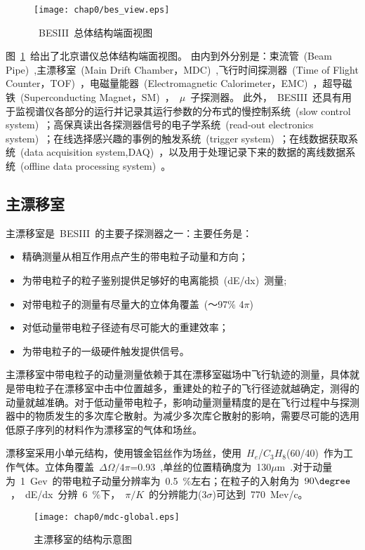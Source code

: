 \begin{figure}[!h]
  \centering
  \texttt{[image: chap0/bes\_view.eps]}
  \caption{~BESIII~总体结构端面视图}
  \label{fig:BESIII}
\end{figure}
图~\ref{fig:BESIII}~给出了北京谱仪总体结构端面视图。
由内到外分别是：束流管~(Beam Pipe)~,主漂移室~(Main Drift Chamber，MDC)~,飞行时间探测器~(Time of Flight Counter，TOF)~，电磁量能器~(Electromagnetic Calorimeter，EMC)~，超导磁铁~(Superconducting Magnet，SM)~，~$\mu$~子探测器。
此外，~BESIII~还具有用于监视谱仪各部分的运行并记录其运行参数的分布式的慢控制系统~(slow control system)~；高保真读出各探测器信号的电子学系统~(read-out electronics system)~；在线选择感兴趣的事例的触发系统~(trigger system)~；在线数据获取系统~(data acquisition system,DAQ)~，以及用于处理记录下来的数据的离线数据系统~(offline data processing system)~。
\subsection{主漂移室}
主漂移室是~BESIII~的主要子探测器之一：主要任务是：

\begin{itemize}
\item{精确测量从相互作用点产生的带电粒子动量和方向；}
\item{为带电粒子的粒子鉴别提供足够好的电离能损~(dE/dx)~测量;}
\item{对带电粒子的测量有尽量大的立体角覆盖~(～97$\%$ 4$\pi$)~}
\item{对低动量带电粒子径迹有尽可能大的重建效率；}
\item{为带电粒子的一级硬件触发提供信号。}
\end{itemize}


主漂移室中带电粒子的动量测量依赖于其在漂移室磁场中飞行轨迹的测量，具体就是带电粒子在漂移室中击中位置越多，重建处的粒子的飞行径迹就越确定，测得的动量就越准确。对于低动量带电粒子，影响动量测量精度的是在飞行过程中与探测器中的物质发生的多次库仑散射。为减少多次库仑散射的影响，需要尽可能的选用低原子序列的材料作为漂移室的气体和场丝。

漂移室采用小单元结构，使用镀金铝丝作为场丝，使用~$H_{e}$/$C_{3}H_{8}$(60/40)~作为工作气体。立体角覆盖~$\Delta\Omega/4\pi$=0.93~,单丝的位置精确度为~130$\mu$m~.对于动量为~1~Gev~的带电粒子动量分辨率为~0.5~$\%$左右；在粒子的入射角为~$90\degree$~，~dE/dx~分辨~6~$\%$下，~$\pi/K$~的分辨能力(3$\sigma$)可达到~770~Mev/c。
\begin{figure}[!h]
  \centering
  \texttt{[image: chap0/mdc-global.eps]}
  \caption{主漂移室的结构示意图}
  \label{fig:mdc-global}
\end{figure}

